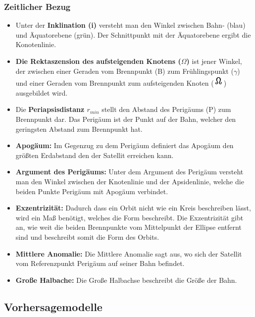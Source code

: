 \subsubsection*{Zeitlicher Bezug}
 \begin{itemize}

	\item Unter der \textbf{Inklination (i)} versteht man den Winkel zwischen 
	Bahn- (blau) und Äquatorebene (grün). Der Schnittpunkt mit der Äquatorebene ergibt die
	Konotenlinie. 
	\item \textbf{Die Rektaszension des aufsteigenden Knotens (\ensuremath{\Omega})} ist jener Winkel, der zwischen einer Geraden vom Brennpunkt (B) zum Frühlingspunkt (\ensuremath{\gamma}) und einer Geraden vom Brennpunkt zum aufsteigenden Knoten (\includegraphics[scale=1.5]{./images/anode.png}) ausgebildet wird.  
	\item Die \textbf{Periapsisdistanz \ensuremath{r_{min}}} stellt den Abstand des Perigäums (P) zum Brennpunkt dar. Das Perigäum ist der Punkt auf der Bahn, welcher den geringsten Abstand zum Brennpunkt hat.
	\item \textbf{Apogäum:} Im Gegenzug zu dem Perigäum definiert das Apogäum 
	den größten Erdabstand den der Satellit erreichen kann.
	\item \textbf{Argument des Perigäums:} Unter dem Argument des Perigäum 
	versteht man den Winkel zwischen der Knotenlinie und der Apsidenlinie, welche 
	die beiden Punkte Perigäum mit Apogäum verbindet.
	\item \textbf{Exzentrizität:} Dadurch dass ein Orbit nicht wie ein Kreis 
	beschreiben lässt, wird ein Maß benötigt, welches die Form beschreibt. Die 
	Exzentrizität gibt an, wie weit die beiden Brennpunkte vom Mittelpunkt der 
	Ellipse entfernt sind und beschreibt somit die Form des Orbits.
	\item \textbf{Mittlere Anomalie:} Die Mittlere Anomalie sagt aus, wo sich 
	der Satellit vom Referenzpunkt Perigäum auf seiner Bahn befindet.
	\item \textbf{Große Halbache:} Die Große Halbachse beschreibt die Größe der
	Bahn.
	
\end{itemize}

\subsection{Vorhersagemodelle}

\clearpage
